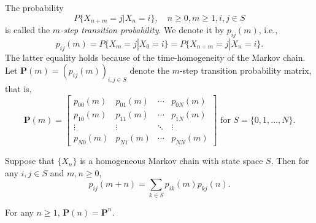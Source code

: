 \begin{definition}
  The probability
  \[
    P\{X_{n+m} = j | X_n = i\}, \quad n \geq 0, m \geq 1, i, j \in S
  \]
  is called the \emph{\(m\)-step transition probability}. We denote it by \(p_{ij}(m)\), i.e.,
  \[
    p_{ij}(m) = P\{X_m = j | X_0 = i\} = P\{X_{n+m} = j | X_n = i\}.
  \]
  The latter equality holds because of the time-homogeneity of the Markov chain. Let \(\mathbf{P}(m) = (p_{ij}(m))_{i, j \in S}\) denote the \(m\)-step transition probability matrix, that is,
  \[
    \mathbf{P}(m) = \begin{bmatrix}
      p_{00}(m) & p_{01}(m) & \cdots & p_{0N}(m) \\
      p_{10}(m) & p_{11}(m) & \cdots & p_{1N}(m) \\
      \vdots & \vdots & \ddots & \vdots \\
      p_{N0}(m) & p_{N1}(m) & \cdots & p_{NN}(m)
    \end{bmatrix}
    \text{ for } S = \{0, 1, \ldots, N\}.
  \]
\end{definition}

\begin{theorem}
  Suppose that \(\{X_n\}\) is a homogeneous Markov chain with state space \(S\). Then for any \(i, j \in S\) and \(m, n \geq 0\),
  \[
    p_{ij}(m + n) = \sum_{k \in S} p_{ik}(m) p_{kj}(n).
  \]
\end{theorem}

\begin{theorem}
  For any \(n \geq 1\), \(\mathbf{P}(n) = \mathbf{P}^n\).
\end{theorem}

